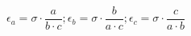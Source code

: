 


$$ \epsilon_a = \sigma \cdot { \frac{a}{ b \cdot c } }; \epsilon_b =
\sigma \cdot { \frac{b}{ a \cdot c } }; \epsilon_c = \sigma \cdot {
\frac{c}{ a \cdot b } } $$



